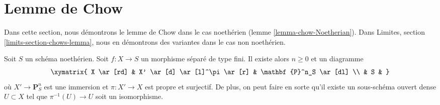 \section{Lemme de Chow}
\label{section-chows-lemma}

\noindent
Dans cette section, nous démontrons le lemme de Chow dans le cas
noethérien (lemme \ref{lemma-chow-Noetherian}).
Dans
Limites, section \ref{limits-section-chows-lemma},
nous en démontrons des variantes dans le cas non noethérien.

\begin{lemma}
\label{lemma-chow-Noetherian}
\begin{reference}
\cite[II théorème 5.6.1(a)]{EGA}
\end{reference}
Soit $S$ un schéma noethérien.
Soit $f : X \to S$ un morphisme séparé de type fini.
Il existe alors $n \geq 0$ et un diagramme
$$
\xymatrix{
X \ar[rd] & X' \ar[d] \ar[l]^\pi \ar[r] & \mathbf{P}^n_S \ar[dl] \\
& S &
}
$$
où $X' \to \mathbf{P}^n_S$ est une immersion et
$\pi : X' \to X$ est propre et surjectif. De plus, on
peut faire en sorte qu'il existe un sous-schéma ouvert dense
$U \subset X$ tel que $\pi^{-1}(U) \to U$ soit un isomorphisme.
\end{lemma}

